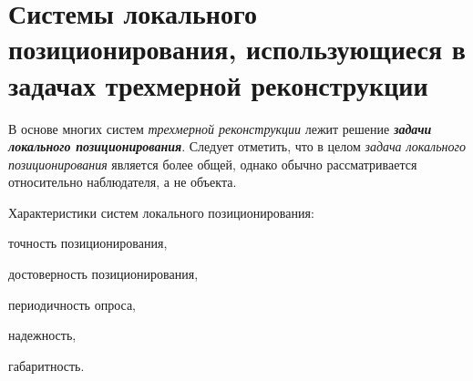 \section{Системы локального позиционирования, использующиеся в задачах трехмерной реконструкции}
\label{sec_3d_models_positioning}

В основе многих систем \textit{трехмерной реконструкции} лежит решение \textbf{\textit{задачи локального позиционирования}}. Следует отметить, что в целом \textit{задача локального позиционирования} является более общей, однако обычно рассматривается относительно наблюдателя, а не объекта.

\begin{SCn}
\end{SCn}

Характеристики систем локального позиционирования:
\begin{textitemize}
    \item точность позиционирования,
    \item достоверность позиционирования,
    \item периодичность опроса,
    \item надежность,
    \item габаритность.
\end{textitemize}

